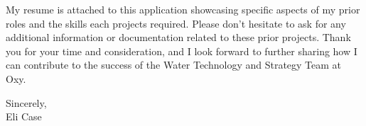 \documentclass[letterpaper,11pt]{letter}
\newcommand{\paragraphbreak}{\vspace{5pt}}
\begin{document}
\paragraphbreak


My resume is attached to this application showcasing specific aspects of my prior roles and the skills each projects required. Please don't hesitate to ask for any additional information or documentation related to these prior projects. Thank you for your time and consideration, and I look forward to further sharing how I can contribute to the success of the Water Technology and Strategy Team at Oxy.

\paragraphbreak

Sincerely, \\
Eli Case
\end{document}
